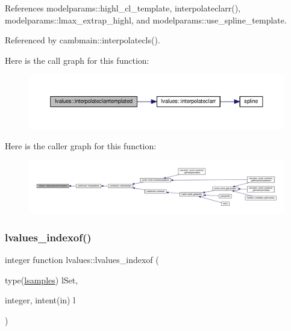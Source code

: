 References modelparams\+::highl\+\_\+cl\+\_\+template, interpolateclarr(), modelparams\+::lmax\+\_\+extrap\+\_\+highl, and modelparams\+::use\+\_\+spline\+\_\+template.



Referenced by cambmain\+::interpolatecls().

Here is the call graph for this function\+:
\nopagebreak
\begin{figure}[H]
\begin{center}
\leavevmode
\includegraphics[width=350pt]{namespacelvalues_a0aa80e0b1f26674e19df96ec0d9c199e_cgraph}
\end{center}
\end{figure}
Here is the caller graph for this function\+:
\nopagebreak
\begin{figure}[H]
\begin{center}
\leavevmode
\includegraphics[width=350pt]{namespacelvalues_a0aa80e0b1f26674e19df96ec0d9c199e_icgraph}
\end{center}
\end{figure}
\mbox{\label{namespacelvalues_ae29d1934474229125b75e4a609f4e81e}} 
\subsubsection{\texorpdfstring{lvalues\+\_\+indexof()}{lvalues\_indexof()}}
{\footnotesize\ttfamily integer function lvalues\+::lvalues\+\_\+indexof (\begin{DoxyParamCaption}\item[{type(\mbox{\hyperlink{structlvalues_1_1lsamples}{lsamples}})}]{l\+Set,  }\item[{integer, intent(in)}]{l }\end{DoxyParamCaption})}



